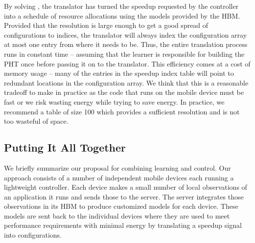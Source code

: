 By solving , the translator has turned the speedup
requested by the controller into a schedule of resource allocations
using the models provided by the HBM.  Provided that the resolution is
large enough to get a good spread of configurations to indices, the
translator will always index the configuration array at most one entry
from where it needs to be.  Thus, the entire translation process runs
in constant time -- assuming that the learner is responsible for
building the PHT once before passing it on to the translator.  This
efficiency comes at a cost of memory usage -- many of the entries in
the speedup index table will point to redundant locations in the
configuration array.  We think that this is a reasonable tradeoff to
make in practice as the code that runs on the mobile device must be
fast or we risk wasting energy while trying to save energy.  In
practice, we recommend a table of size 100 which provides a sufficient
resolution and is not too wasteful of space.


\subsection{Putting It All Together}
We briefly summarize our proposal for combining learning and control.
Our approach consists of a number of independent mobile devices each
running a lightweight controller.  Each device makes a small number of
local observations of an application it runs and sends those to the
server.  The server integrates those observations in its HBM to
produce customized models for each device.  These models are sent back
to the individual devices where they are used to meet performance
requirements with minimal energy by translating a speedup signal into
configurations.








